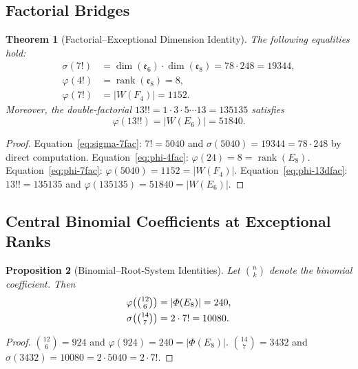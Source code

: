 \documentclass[11pt]{amsart}
\theoremstyle{plain}
\newtheorem{theorem}{Theorem}[section]
\newtheorem{proposition}[theorem]{Proposition}
\theoremstyle{definition}
\theoremstyle{remark}
\renewcommand{\Phi}{\varPhi}
\begin{document}
\subsection{Factorial Bridges}

\begin{theorem}[Factorial--Exceptional Dimension Identity]
\label{thm:factorial-bridges}
The following equalities hold:
\begin{align}
  \sigma(7!) &= \dim(\mathfrak{e}_6)\cdot\dim(\mathfrak{e}_8)
               = 78\cdot 248 = 19344, \label{eq:sigma-7fac}\\
  \varphi(4!) &= \operatorname{rank}(\mathfrak{e}_8) = 8, \label{eq:phi-4fac}\\
  \varphi(7!) &= |W(F_4)| = 1152. \label{eq:phi-7fac}
\end{align}
Moreover, the double-factorial $13!! = 1\cdot3\cdot5\cdots13 = 135135$
satisfies
\begin{equation}
  \varphi(13!!) = |W(E_6)| = 51840. \label{eq:phi-13dfac}
\end{equation}
\end{theorem}

\begin{proof}
Equation~\eqref{eq:sigma-7fac}: $7!=5040$ and
$\sigma(5040)=19344=78\cdot248$ by direct computation.
Equation~\eqref{eq:phi-4fac}: $\varphi(24)=8=\operatorname{rank}(E_8)$.
Equation~\eqref{eq:phi-7fac}: $\varphi(5040)=1152=|W(F_4)|$.
Equation~\eqref{eq:phi-13dfac}: $13!!=135135$ and
$\varphi(135135)=51840=|W(E_6)|$.
\end{proof}

\subsection{Central Binomial Coefficients at Exceptional Ranks}

\begin{proposition}[Binomial--Root-System Identities]
\label{prop:central-binomial}
Let $\binom{n}{k}$ denote the binomial coefficient.  Then
\begin{align}
  \varphi\!\left(\tbinom{12}{6}\right) &= |\Phi(E_8)| = 240,
    \label{eq:phi-C126}\\
  \sigma\!\left(\tbinom{14}{7}\right) &= 2\cdot 7! = 10080.
    \label{eq:sigma-C147}
\end{align}
\end{proposition}

\begin{proof}
$\binom{12}{6}=924$ and $\varphi(924)=240=|\Phi(E_8)|$.
$\binom{14}{7}=3432$ and $\sigma(3432)=10080=2\cdot5040=2\cdot7!$.
\end{proof}
\end{document}
